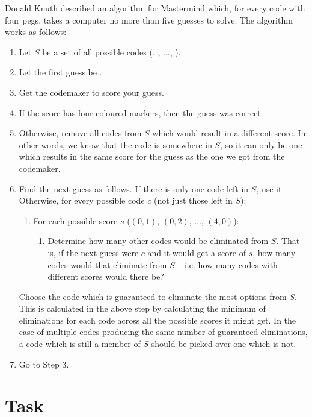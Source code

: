 Donald Knuth described an algorithm for Mastermind which, for every code with four pegs, takes a computer no more than five guesses to solve. The algorithm works as follows:

\begin{enumerate}
    \item Let $S$ be a set of all possible codes (, , $\ldots$, ).
    \item Let the first guess be .
    \item Get the codemaker to score your guess.
    \item If the score has four coloured markers, then the guess was correct.
    \item Otherwise, remove all codes from $S$ which would result in a different score. In other words, we know that the code is somewhere in $S$, so it can only be one which results in the same score for the guess as the one we got from the codemaker. 
    \item Find the next guess as follows. If there is only one code left in $S$, use it. Otherwise, for every possible code $c$ (not just those left in $S$):
    \begin{enumerate}
        \item For each possible score $s$ ($(0,1)$, $(0,2)$, $\ldots$, $(4,0)$):
        \begin{enumerate}
            \item Determine how many other codes would be eliminated from $S$. That is, if the next guess were $c$ and it would get a score of $s$, how many codes would that eliminate from $S$ -- i.e. how many codes with different scores would there be?
        \end{enumerate}
    \end{enumerate}
    Choose the code which is guaranteed to eliminate the most options from $S$. This is calculated in the above step by calculating the minimum of eliminations for each code across all the possible scores it might get.
    In the case of multiple codes producing the same number of guaranteed eliminations, a code which is still a member of $S$ should be picked over one which is not.
    \item Go to Step 3.
\end{enumerate}


\section{Task}

